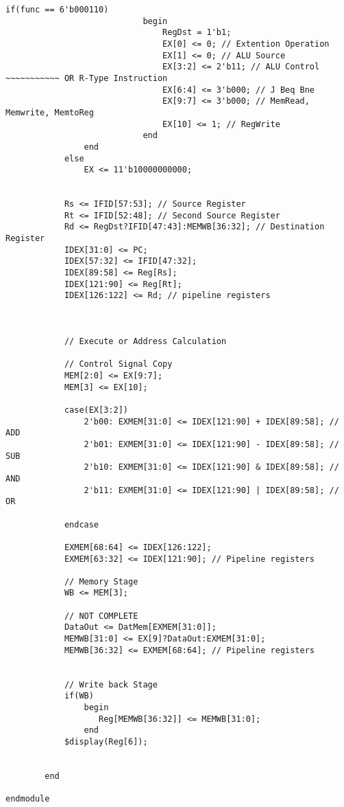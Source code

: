 \documentclass{article}
\begin{document}
\begin{lstlisting}[caption={ .}, label={lst:exemplo}, firstnumber=1, frame=single]
                    if(func == 6'b000110)
                            begin
                                RegDst = 1'b1;
                                EX[0] <= 0; // Extention Operation
                                EX[1] <= 0; // ALU Source
                                EX[3:2] <= 2'b11; // ALU Control ~~~~~~~~~~~ OR R-Type Instruction
                                EX[6:4] <= 3'b000; // J Beq Bne
                                EX[9:7] <= 3'b000; // MemRead, Memwrite, MemtoReg
                                EX[10] <= 1; // RegWrite                                                       
                            end                               
                end
            else
                EX <= 11'b10000000000;


            Rs <= IFID[57:53]; // Source Register
            Rt <= IFID[52:48]; // Second Source Register 
            Rd <= RegDst?IFID[47:43]:MEMWB[36:32]; // Destination Register
            IDEX[31:0] <= PC;
            IDEX[57:32] <= IFID[47:32];
            IDEX[89:58] <= Reg[Rs];
            IDEX[121:90] <= Reg[Rt];
            IDEX[126:122] <= Rd; // pipeline registers
            

            
            // Execute or Address Calculation
            
            // Control Signal Copy
            MEM[2:0] <= EX[9:7];
            MEM[3] <= EX[10];
            
            case(EX[3:2])
                2'b00: EXMEM[31:0] <= IDEX[121:90] + IDEX[89:58]; // ADD
                2'b01: EXMEM[31:0] <= IDEX[121:90] - IDEX[89:58]; // SUB
                2'b10: EXMEM[31:0] <= IDEX[121:90] & IDEX[89:58]; // AND
                2'b11: EXMEM[31:0] <= IDEX[121:90] | IDEX[89:58]; // OR

            endcase
            
            EXMEM[68:64] <= IDEX[126:122];
            EXMEM[63:32] <= IDEX[121:90]; // Pipeline registers
            
            // Memory Stage
            WB <= MEM[3];
            
            // NOT COMPLETE
            DataOut <= DatMem[EXMEM[31:0]];
            MEMWB[31:0] <= EX[9]?DataOut:EXMEM[31:0];
            MEMWB[36:32] <= EXMEM[68:64]; // Pipeline registers

            
            // Write back Stage
            if(WB)
                begin
                   Reg[MEMWB[36:32]] <= MEMWB[31:0];
                end
            $display(Reg[6]);

            
        end

endmodule

\end{lstlisting}
\end{document}
